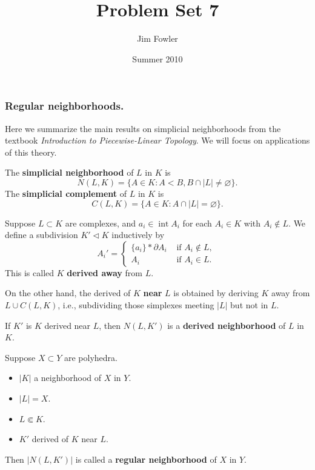 \documentclass[12pt]{pset}
\title{Problem Set 7}
\author{Jim Fowler}
\date{Summer 2010}
\newcommand{\join}{\ast}
\newcommand{\subdivided}{\triangleleft}
\DeclareMathOperator{\interior}{int}
\newcommand{\fullsubcomplex}{\Subset}
\begin{document}
\maketitle

\subsubsection*{Regular neighborhoods.} Here we summarize the main
results on simplicial neighborhoods from the textbook
\textit{Introduction to Piecewise-Linear Topology}.  We will focus on
applications of this theory.



\begin{definition*}
  The \textbf{simplicial neighborhood} of $L$ in $K$ is
  $$N(L,K) = \{ A \in K : A < B, B \cap |L| \neq \varnothing \}.$$
  The \textbf{simplicial complement} of $L$ in $K$ is
  $$  C(L,K) = \{ A \in K : A \cap |L| = \varnothing \}. $$
\end{definition*}

\begin{definition*}
 Suppose $L \subset K$ are complexes, and $a_i \in \interior A_i$ for each $A_i \in K$ with $A_i \not\in L$.
 We define a subdivision $K' \subdivided K$ 
  inductively by
  $$
  {A_i}'  = \begin{cases}
    \{ a_i \} \join \partial {A_i} & \mbox{ if $A_i \not\in L$, } \\
    A_i & \mbox{ if $A_i \in L$.}
    \end{cases}
  $$
  This is called $K$ \textbf{derived away} from $L$.

  On the other hand, the derived of $K$ \textbf{near} $L$ is obtained
  by deriving $K$ away from $L \cup C(L,K)$, i.e., subdividing those
  simplexes meeting $|L|$ but not in $L$.

  If $K'$ is $K$ derived near $L$, then $N(L,K')$ is a \textbf{derived neighborhood} of $L$ in $K$.
\end{definition*}

\begin{definition*}
Suppose $X \subset Y$ are polyhedra.
\begin{itemize}
\item $|K|$ a neighborhood of $X$ in $Y$.
\item $|L| = X$.
\item $L \fullsubcomplex K$.
\item $K'$ derived of $K$ near $L$.
\end{itemize}
Then $|N(L,K')|$ is called a \textbf{regular neighborhood} of $X$ in $Y$.
\end{definition*}
\end{document}
